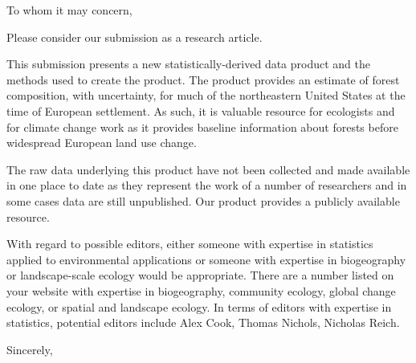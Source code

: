 \documentclass[12pt]{letterhead_stat}
\begin{document}
\signature{\vspace{-2em}\hspace{-.3cm}\texttt{[image: goodSignature.jpg]}\\Christopher Paciorek\\Associate Research Statistician\\Department of Statistics\\University of California, Berkeley}
\begin{letter}{\mbox{}}
\opening{To whom it may concern,}

Please consider our submission as a research article. 

This submission presents a new statistically-derived data product and the methods used to create the product. The product provides an estimate of forest composition, with uncertainty, for much of the northeastern United States at the time of European settlement. As such, it is valuable resource for ecologists and for climate change work as it provides baseline information about forests before widespread European land use change. 

The raw data underlying this product have not been collected and made available in one place to date as they represent the work of a number of researchers and in some cases data are still unpublished. Our product provides a publicly available resource. 

With regard to possible editors, either someone with expertise in statistics applied to environmental applications or someone with expertise in biogeography or landscape-scale ecology would be appropriate. There are a number listed on your website with expertise in biogeography, community ecology, global change ecology, or spatial and landscape ecology. In terms of editors with expertise in statistics, potential editors include Alex Cook, Thomas Nichols, Nicholas Reich.



\closing{Sincerely,}
\end{letter}
\end{document}
